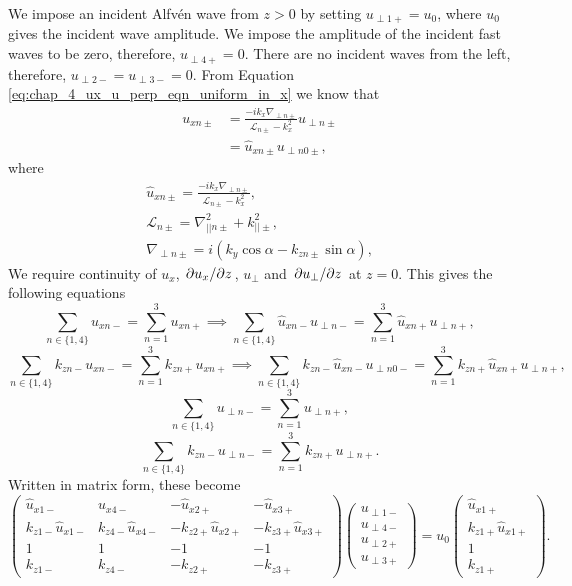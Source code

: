 We impose an incident Alfv\'en wave from $z>0$ by setting $u_{\perp1+}=u_0$, where $u_0$ gives the incident wave amplitude. We impose the amplitude of the incident fast waves to be zero, therefore, $u_{\perp 4+}=0$. There are no incident waves from the left, therefore, $u_{\perp2-}=u_{\perp3-}=0$. From Equation \eqref{eq:chap_4_ux_u_perp_eqn_uniform_in_x} we know that
\begin{equation}
    \label{eq:uxn_pm_oblique_field_piecewise_constant_density}
    \begin{aligned}
    u_{x n\pm} &= \frac{-ik_x\nabla_{\perp n\pm}}{\mathcal{L}_{n\pm}-k_x^2}u_{\perp n\pm} \\
    &= \hat{u}_{x n\pm}u_{\perp n0\pm},
\end{aligned}
\end{equation}
where
\begin{gather}
    \hat{u}_{x n\pm} = \frac{-ik_x\nabla_{\perp n\pm}}{\mathcal{L}_{n\pm}-k_x^2}, \\
    \mathcal{L}_{n\pm}=\nabla_{||n\pm}^2+k_{||\pm}^2, \\
    \nabla_{\perp n\pm} = i(k_y\cos\alpha - k_{zn\pm}\sin\alpha),
\end{gather}
We require continuity of $u_x$, $\pdv*{u_x}{z}$, $u_\perp$ and $\pdv*{u_\perp}{z}$ at $z=0$. This gives the following equations
\[\sum_{n\in\{1,4\}}u_{xn-}=\sum_{n=1}^3u_{xn+}\implies \sum_{n\in\{1,4\}}\hat{u}_{xn-}u_{\perp n-}=\sum_{n=1}^3\hat{u}_{xn+}u_{\perp n+},\]
\[\sum_{n\in\{1,4\}}k_{zn-}u_{xn-}=\sum_{n=1}^3k_{zn+}u_{xn+}\implies \sum_{n\in\{1,4\}}k_{zn-}\hat{u}_{xn-}u_{\perp n0-}=\sum_{n=1}^3k_{zn+}\hat{u}_{xn+}u_{\perp n+},\]
\[\sum_{n\in\{1,4\}}u_{\perp n-}=\sum_{n=1}^3u_{\perp n+},\]
\[\sum_{n\in\{1,4\}}k_{zn-}u_{\perp n-}=\sum_{n=1}^3k_{zn+}u_{\perp n+}.\]
Written in matrix form, these become
\[
    \begin{pmatrix}
    \hat{u}_{x1-} & \hat{u}_{x4-} & -\hat{u}_{x2+} & -\hat{u}_{x3+} \\
    k_{z1-}\hat{u}_{x1-} & k_{z4-}\hat{u}_{x4-} & -k_{z2+}\hat{u}_{x2+} & -k_{z3+}\hat{u}_{x3+} \\
    1 & 1 & -1 &-1 \\
    k_{z1-} & k_{z4-} & -k_{z2+} & -k_{z3+}
    \end{pmatrix}
    \begin{pmatrix}
    u_{\perp 1-} \\
    u_{\perp 4-} \\
    u_{\perp 2+} \\
    u_{\perp 3+}
    \end{pmatrix}
    =u_0
    \begin{pmatrix}
    \hat{u}_{x1+} \\
    k_{z1+}\hat{u}_{x1+} \\
    1 \\
    k_{z1+}
    \end{pmatrix}.
\]
